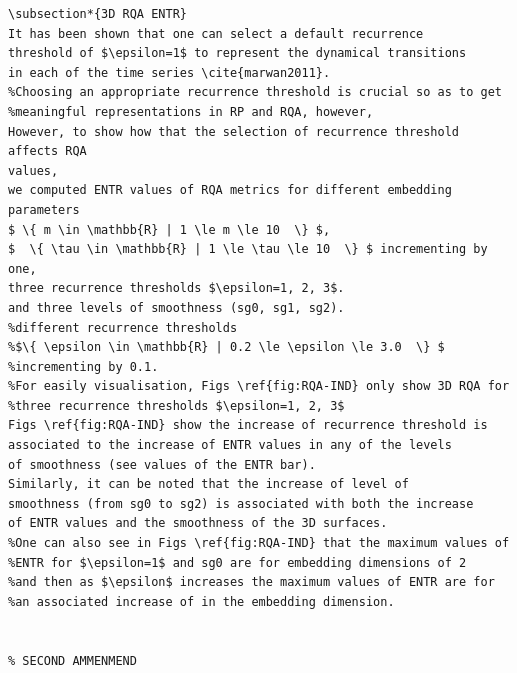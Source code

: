 \documentclass[10pt]{article}
\begin{document}
\begin{enumerate}
\begin{verbatim}
\subsection*{3D RQA ENTR}
It has been shown that one can select a default recurrence 
threshold of $\epsilon=1$ to represent the dynamical transitions 
in each of the time series \cite{marwan2011}.
%Choosing an appropriate recurrence threshold is crucial so as to get 
%meaningful representations in RP and RQA, however, 
However, to show how that the selection of recurrence threshold affects RQA
values, 
we computed ENTR values of RQA metrics for different embedding parameters
$ \{ m \in \mathbb{R} | 1 \le m \le 10  \} $,
$  \{ \tau \in \mathbb{R} | 1 \le \tau \le 10  \} $ incrementing by one, 
three recurrence thresholds $\epsilon=1, 2, 3$.
and three levels of smoothness (sg0, sg1, sg2). 
%different recurrence thresholds 
%$\{ \epsilon \in \mathbb{R} | 0.2 \le \epsilon \le 3.0  \} $
%incrementing by 0.1.
%For easily visualisation, Figs \ref{fig:RQA-IND} only show 3D RQA for 
%three recurrence thresholds $\epsilon=1, 2, 3$ 
Figs \ref{fig:RQA-IND} show the increase of recurrence threshold is 
associated to the increase of ENTR values in any of the levels 
of smoothness (see values of the ENTR bar).
Similarly, it can be noted that the increase of level of 
smoothness (from sg0 to sg2) is associated with both the increase 
of ENTR values and the smoothness of the 3D surfaces.
%One can also see in Figs \ref{fig:RQA-IND} that the maximum values of 
%ENTR for $\epsilon=1$ and sg0 are for embedding dimensions of 2 
%and then as $\epsilon$ increases the maximum values of ENTR are for
%an associated increase of in the embedding dimension.


% SECOND AMMENMEND

\end{verbatim}
\end{enumerate}
\end{document}
